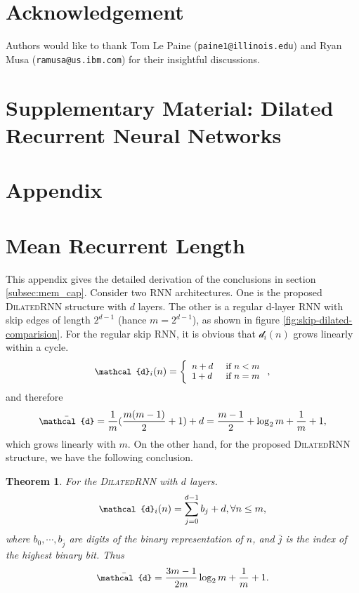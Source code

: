 \documentclass{article}
\newtheorem{theorem}{Theorem}[section]
\newcommand{\algname}{\textsc{DilatedRNN }}
\begin{document}
\section*{Acknowledgement}
Authors would like to thank Tom Le Paine (\texttt{paine1@illinois.edu}) and Ryan Musa (\texttt{ramusa@us.ibm.com}) for their insightful discussions.  

{
\small


}

\newpage
\section*{Supplementary Material: Dilated Recurrent Neural Networks}
\section*{Appendix}
\appendix
\section{Mean Recurrent Length}
\label{appendix:mean_recurrent_length}
This appendix gives the detailed derivation of the conclusions in section \ref{subsec:mem_cap}. Consider two RNN architectures. One is the proposed \algname structure with $d$ layers. The other is a regular d-layer RNN with skip edges of length $2^{d-1}$ (hance $m = 2^{d-1}$), as shown in figure \ref{fig:skip-dilated-comparision}.  For the regular skip RNN, it is obvious that $\mathcal{d}_i(n)$ grows linearly within a cycle.
\begin{equation*}
\small
\mathcal{d}_i(n) = \left\{
\begin{array}{ll}
n + d & \mbox{ if } n < m \\
1 + d & \mbox{ if } n = m
\end{array}
\right.,
\end{equation*}
and therefore
\begin{equation*}
\small
\bar{\mathcal{d}} = \frac{1}{m}(\frac{m(m-1)}{2} + 1) + d = \frac{m-1}{2} + \log_2{m} + \frac{1}{m} + 1,
\end{equation*}
which grows linearly with $m$. On the other hand, for the proposed \algname structure, we have the following conclusion.
\begin{theorem}
For the \algname with $d$ layers.
\begin{equation}
\small
\mathcal{d}_i(n) = \sum_{j=0}^{d-1} b_j + d, \forall n \leq m,
\end{equation}
where {$b_0,\cdots,b_{\bar{j}}$} are digits of the binary representation of $n$, and $\bar{j}$ is the index of the highest binary bit. Thus
\begin{equation}
\small
\bar{\mathcal{d}} = \frac{3m-1}{2m} \log_2 m + \frac{1}{m} + 1.
\end{equation}
\label{thm:shortest_path}
\end{theorem}
\end{document}
